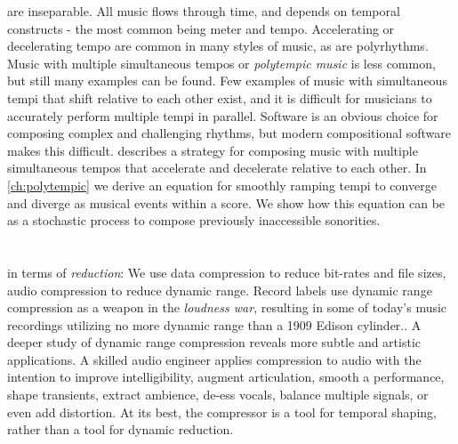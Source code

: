  are inseparable. All music flows through
time, and depends on temporal constructs - the most common being meter
and tempo. Accelerating or decelerating tempo are common in many
styles of music, as are polyrhythms.  Music with multiple simultaneous
tempos or \textit{polytempic music} is less common, but still many
examples can be found. Few examples of music with simultaneous tempi
that shift relative to each other exist, and it is difficult for
musicians to accurately perform multiple tempi in parallel. Software
is an obvious choice for composing complex and challenging rhythms,
but modern compositional software makes this difficult. \polytempic
describes a strategy for composing music with multiple simultaneous
tempos that accelerate and decelerate relative to each other. In
\autoref{ch:polytempic} we derive an equation for smoothly ramping
tempi to converge and diverge as musical events within a score. We
show how this equation can be as a stochastic process to compose
previously inaccessible sonorities. 

\section{\thesis}
\label{sec:hypercompression-intro}
 in terms of
\emph{reduction}: We use data compression to reduce bit-rates and file
sizes, audio compression to reduce dynamic range. Record labels use
dynamic range compression as a weapon in the \emph{loudness
  war}\cite{Deruty2014a}, resulting in some of today's music
recordings utilizing no more dynamic range than a 1909 Edison
cylinder.\cite{Katz2007}. A deeper study of dynamic range compression
reveals more subtle and artistic applications. A skilled audio
engineer applies compression to audio with the intention to improve
intelligibility, augment articulation, smooth a performance, shape
transients, extract ambience, de-ess vocals, balance multiple signals,
or even add distortion.\cite{Case2007} At its best, the compressor is
a tool for temporal shaping, rather than a tool for dynamic reduction.

